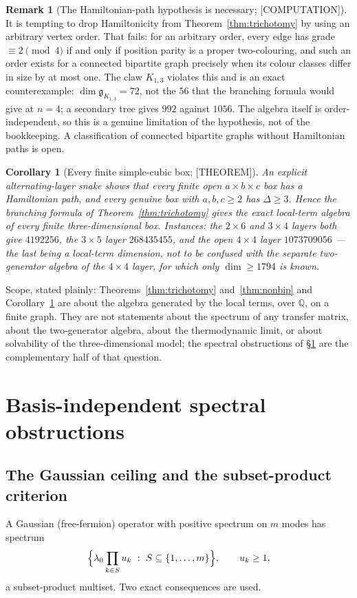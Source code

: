 \documentclass[11pt]{article}
\newtheorem{corollary}[theorem]{Corollary}
\theoremstyle{definition}
\newtheorem{remark}[theorem]{Remark}
\newcommand{\Qb}{\mathbb{Q}}
\newcommand{\alg}{\mathfrak{g}}
\begin{document}
\begin{remark}[The Hamiltonian-path hypothesis is necessary; {[COMPUTATION]}]
It is tempting to drop Hamiltonicity from Theorem~\ref{thm:trichotomy} by using an arbitrary vertex
order. That fails: for an arbitrary order, every edge has grade $\equiv2\pmod4$ if and only if
position parity is a proper two-colouring, and such an order exists for a connected bipartite graph
precisely when its colour classes differ in size by at most one. The claw $K_{1,3}$ violates this and
is an exact counterexample: $\dim\alg_{K_{1,3}}=72$, not the $56$ that the branching formula would
give at $n=4$; a secondary tree gives $992$ against $1056$. The algebra itself is
order-independent, so this is a genuine limitation of the hypothesis, not of the bookkeeping. A
classification of connected bipartite graphs without Hamiltonian paths is open.
\end{remark}

\begin{corollary}[Every finite simple-cubic box; {[THEOREM]}]\label{cor:box}
An explicit alternating-layer snake shows that every finite open $a\times b\times c$ box has a
Hamiltonian path, and every genuine box with $a,b,c\ge2$ has $\Delta\ge3$. Hence the branching
formula of Theorem~\ref{thm:trichotomy} gives the exact local-term algebra of every finite
three-dimensional box. Instances: the $2\times6$ and $3\times4$ layers both give $4192256$, the
$3\times5$ layer $268435455$, and the open $4\times4$ layer $1073709056$ --- the last being a
local-term dimension, not to be confused with the separate two-generator algebra of the $4\times4$
layer, for which only $\dim\ge1794$ is known.
\end{corollary}

Scope, stated plainly: Theorems~\ref{thm:trichotomy} and~\ref{thm:nonbip} and
Corollary~\ref{cor:box} are about the algebra generated by the local terms, over $\Qb$, on a finite
graph. They are not statements about the spectrum of any transfer matrix, about the two-generator
algebra, about the thermodynamic limit, or about solvability of the three-dimensional model; the
spectral obstructions of \S\ref{sec:spectral} are the complementary half of that question.


\section{Basis-independent spectral obstructions}\label{sec:spectral}

\subsection{The Gaussian ceiling and the subset-product criterion}
A Gaussian (free-fermion) operator with positive spectrum on $m$ modes has spectrum
\begin{equation}
\Bigl\{\lambda_0\prod_{k\in S}u_k\ :\ S\subseteq\{1,\dots,m\}\Bigr\},\qquad u_k\ge1,
\label{eq:subsetproduct}
\end{equation}
a subset-product multiset. Two exact consequences are used.
\end{document}
